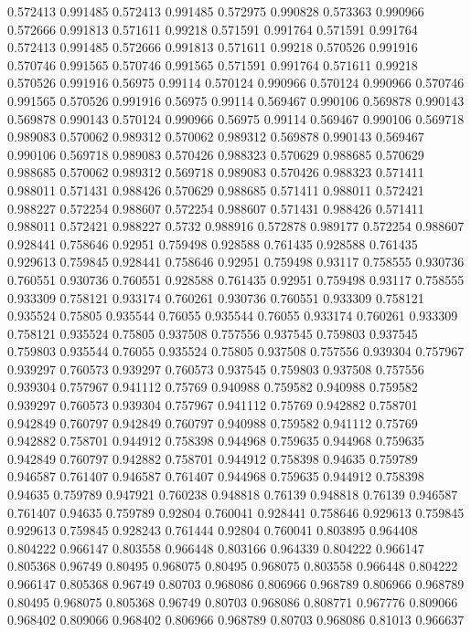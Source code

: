 0.572413 0.991485
0.572413 0.991485
0.572975 0.990828
0.573363 0.990966
0.572666 0.991813
0.571611 0.99218
0.571591 0.991764
0.571591 0.991764
0.572413 0.991485
0.572666 0.991813
0.571611 0.99218
0.570526 0.991916
0.570746 0.991565
0.570746 0.991565
0.571591 0.991764
0.571611 0.99218
0.570526 0.991916
0.56975 0.99114
0.570124 0.990966
0.570124 0.990966
0.570746 0.991565
0.570526 0.991916
0.56975 0.99114
0.569467 0.990106
0.569878 0.990143
0.569878 0.990143
0.570124 0.990966
0.56975 0.99114
0.569467 0.990106
0.569718 0.989083
0.570062 0.989312
0.570062 0.989312
0.569878 0.990143
0.569467 0.990106
0.569718 0.989083
0.570426 0.988323
0.570629 0.988685
0.570629 0.988685
0.570062 0.989312
0.569718 0.989083
0.570426 0.988323
0.571411 0.988011
0.571431 0.988426
0.570629 0.988685
0.571411 0.988011
0.572421 0.988227
0.572254 0.988607
0.572254 0.988607
0.571431 0.988426
0.571411 0.988011
0.572421 0.988227
0.5732 0.988916
0.572878 0.989177
0.572254 0.988607
0.928441 0.758646
0.92951 0.759498
0.928588 0.761435
0.928588 0.761435
0.929613 0.759845
0.928441 0.758646
0.92951 0.759498
0.93117 0.758555
0.930736 0.760551
0.930736 0.760551
0.928588 0.761435
0.92951 0.759498
0.93117 0.758555
0.933309 0.758121
0.933174 0.760261
0.930736 0.760551
0.933309 0.758121
0.935524 0.75805
0.935544 0.76055
0.935544 0.76055
0.933174 0.760261
0.933309 0.758121
0.935524 0.75805
0.937508 0.757556
0.937545 0.759803
0.937545 0.759803
0.935544 0.76055
0.935524 0.75805
0.937508 0.757556
0.939304 0.757967
0.939297 0.760573
0.939297 0.760573
0.937545 0.759803
0.937508 0.757556
0.939304 0.757967
0.941112 0.75769
0.940988 0.759582
0.940988 0.759582
0.939297 0.760573
0.939304 0.757967
0.941112 0.75769
0.942882 0.758701
0.942849 0.760797
0.942849 0.760797
0.940988 0.759582
0.941112 0.75769
0.942882 0.758701
0.944912 0.758398
0.944968 0.759635
0.944968 0.759635
0.942849 0.760797
0.942882 0.758701
0.944912 0.758398
0.94635 0.759789
0.946587 0.761407
0.946587 0.761407
0.944968 0.759635
0.944912 0.758398
0.94635 0.759789
0.947921 0.760238
0.948818 0.76139
0.948818 0.76139
0.946587 0.761407
0.94635 0.759789
0.92804 0.760041
0.928441 0.758646
0.929613 0.759845
0.929613 0.759845
0.928243 0.761444
0.92804 0.760041
0.803895 0.964408
0.804222 0.966147
0.803558 0.966448
0.803166 0.964339
0.804222 0.966147
0.805368 0.96749
0.80495 0.968075
0.80495 0.968075
0.803558 0.966448
0.804222 0.966147
0.805368 0.96749
0.80703 0.968086
0.806966 0.968789
0.806966 0.968789
0.80495 0.968075
0.805368 0.96749
0.80703 0.968086
0.808771 0.967776
0.809066 0.968402
0.809066 0.968402
0.806966 0.968789
0.80703 0.968086
0.81013 0.966637
